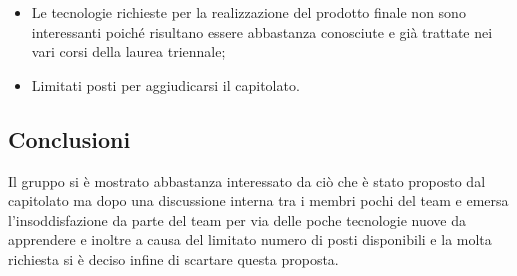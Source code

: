 \begin{itemize}
\item Le tecnologie richieste per la realizzazione del prodotto finale non sono interessanti poiché risultano essere abbastanza conosciute e già trattate nei vari corsi della laurea triennale;
\item Limitati posti per aggiudicarsi il capitolato.

\end{itemize}
\subsection{Conclusioni}
Il gruppo si \`e mostrato abbastanza interessato da ci\`o che \`e stato proposto dal capitolato ma dopo una discussione interna tra i membri pochi del team e emersa l'insoddisfazione da parte del team per via delle poche tecnologie nuove da apprendere e inoltre a causa del limitato numero di posti disponibili e la molta richiesta si \`e deciso infine di scartare questa proposta.